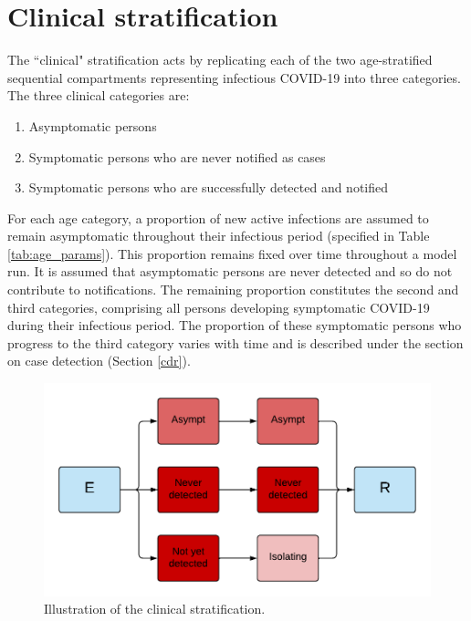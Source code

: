 \section{Clinical stratification} \label{clin}
The ``clinical" stratification acts by replicating each of the two age-stratified sequential compartments representing infectious COVID-19 into three categories.
The three clinical categories are:
\begin{enumerate}
    \item Asymptomatic persons
    \item Symptomatic persons who are never notified as cases
    \item Symptomatic persons who are successfully detected and notified
\end{enumerate}
For each age category, a proportion of new active infections are assumed to remain asymptomatic throughout their infectious period (specified in Table \ref{tab:age_params}).
This proportion remains fixed over time throughout a model run.
It is assumed that asymptomatic persons are never detected and so do not contribute to notifications.
The remaining proportion constitutes the second and third categories, comprising all persons developing symptomatic COVID-19 during their infectious period.
The proportion of these symptomatic persons who progress to the third category varies with time and is described under the section on case detection (Section \ref{cdr}).
\begin{figure}[ht]
    \includegraphics[width=\textwidth]{../../tex_descriptions/models/sm_sir/stratifications/clinical_strat.pdf}
    \caption[]{Illustration of the clinical stratification.}
    \label{fig:seeiir}
\end{figure}